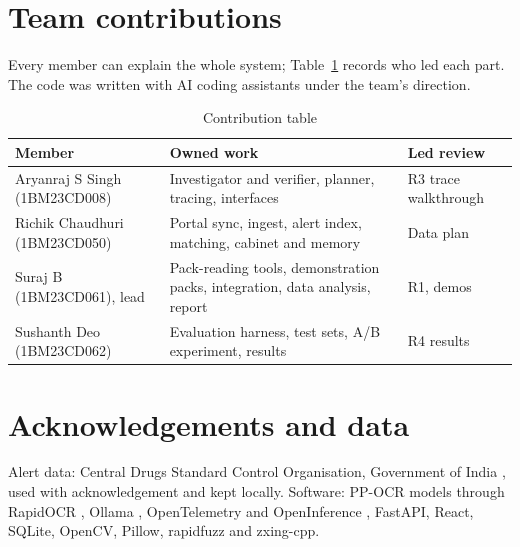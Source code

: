 \section*{Team contributions}

Every member can explain the whole system; Table~\ref{tab:contrib} records who led each part. The code was written with AI coding assistants under the team's direction.

\begin{table}[h]
\centering
\caption{Contribution table}
\label{tab:contrib}
\scriptsize
\begin{tabularx}{\columnwidth}{@{}>{\raggedright\arraybackslash}p{17mm} X >{\raggedright\arraybackslash}p{14mm}@{}}
\toprule
Member & Owned work & Led review \\
\midrule
Aryanraj S Singh (1BM23CD008) & Investigator and verifier, planner, tracing, interfaces & R3 trace walkthrough \\
Richik Chaudhuri (1BM23CD050) & Portal sync, ingest, alert index, matching, cabinet and memory & Data plan \\
Suraj B (1BM23CD061), lead & Pack-reading tools, demonstration packs, integration, data analysis, report & R1, demos \\
Sushanth Deo (1BM23CD062) & Evaluation harness, test sets, A/B experiment, results & R4 results \\
\bottomrule
\end{tabularx}
\end{table}

\section*{Acknowledgements and data}
Alert data: Central Drugs Standard Control Organisation, Government of India \cite{cdsco2026portal}, used with acknowledgement and kept locally. Software: PP-OCR models through RapidOCR \cite{du2020ppocr,rapidai2021rapidocr}, Ollama \cite{ollama2026structured}, OpenTelemetry and OpenInference \cite{otel2026genai,arize2026openinference}, FastAPI, React, SQLite, OpenCV, Pillow, rapidfuzz and zxing-cpp.
